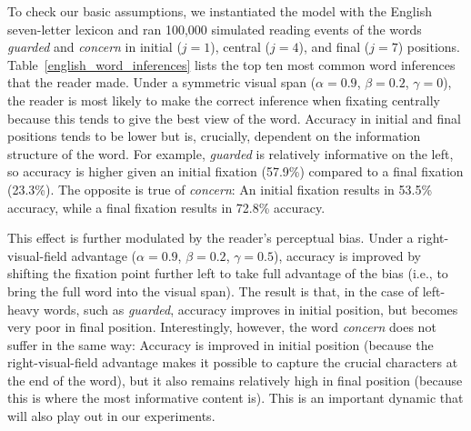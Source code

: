 \documentclass[doc,biblatex,floatsintext]{apa7}
\begin{document}
To check our basic assumptions, we instantiated the model with the English seven-letter lexicon and ran 100,000 simulated reading events of the words \textit{guarded} and \textit{concern} in initial ($j=1$), central ($j=4$), and final ($j=7$) positions. Table~\ref{english_word_inferences} lists the top ten most common word inferences that the reader made. Under a symmetric visual span ($\alpha = 0.9$, $\beta = 0.2$, $\gamma = 0$), the reader is most likely to make the correct inference when fixating centrally because this tends to give the best view of the word. Accuracy in initial and final positions tends to be lower but is, crucially, dependent on the information structure of the word. For example, \textit{guarded} is relatively informative on the left, so accuracy is higher given an initial fixation (57.9\%) compared to a final fixation (23.3\%). The opposite is true of \textit{concern}: An initial fixation results in 53.5\% accuracy, while a final fixation results in 72.8\% accuracy.

This effect is further modulated by the reader's perceptual bias. Under a right-visual-field advantage ($\alpha = 0.9$, $\beta = 0.2$, $\gamma = 0.5$), accuracy is improved by shifting the fixation point further left to take full advantage of the bias (i.e., to bring the full word into the visual span). The result is that, in the case of left-heavy words, such as \textit{guarded}, accuracy improves in initial position, but becomes very poor in final position. Interestingly, however, the word \textit{concern} does not suffer in the same way: Accuracy is improved in initial position (because the right-visual-field advantage makes it possible to capture the crucial characters at the end of the word), but it also remains relatively high in final position (because this is where the most informative content is). This is an important dynamic that will also play out in our experiments.
\end{document}
